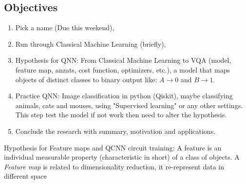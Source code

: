 \subsection{Objectives}
\begin{enumerate}
    \item Pick a name (Due this weekend),
    \item Run through Classical Machine Learning (briefly),
    \item Hypothesis for QNN: From Classical Machine Learning to VQA (model, feature map, anzats, cost function, optimizers, etc.), a model that maps objects of distinct classes to binary output like: $A \to 0$ and $B \to 1$.
    \item Practice QNN: Image classification in python (Qiskit), maybe classifying animals, cats and mouses, using "Supervised learning" or any other settings. This step test the model if not work then need to alter the hypothesis.
    \item Conclude the research with summary, motivation and applications.
\end{enumerate}

Hypothesis for Feature maps and QCNN circuit training: A feature is an individual measurable property (characteristic in short) of a class of objects. A \textit{Feature map} is related to dimensionality reduction, it re-represent data in different space

